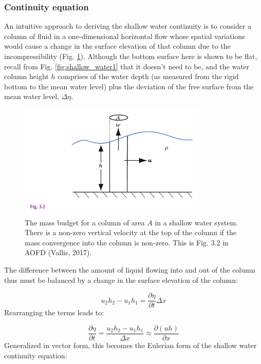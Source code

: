 \documentclass[12pt]{article}
\numberwithin{equation}{section}
\numberwithin{figure}{section}
\numberwithin{table}{section}
\begin{document}
\subsubsection{Continuity equation}

An intuitive approach to deriving the shallow water continuity is to consider
a column of fluid in a one-dimensional horizontal flow whose spatial variations
would cause a change in the surface elevation of that column due to the
incompressibility (Fig. \ref{fig:shallow_water2}).
Although the bottom surface here is shown to be flat, recall from Fig.
\ref{fig:shallow_water1} that it doesn't need to be, and the water column height
$h$ comprises of the water depth (as measured from the rigid bottom to the mean
water level) plus the deviation of the free surface from the mean water level,
$\Delta \eta$.

\begin{figure}[h]
  \centering
  \includegraphics[width=0.8\textwidth]{assets/fig_shallow_water2.pdf}
  \caption{
    The mass budget for a column of area $A$ in a shallow water system.
    There is a non-zero vertical velocity at the top of the column if the mass
    convergence into the column is non-zero.
    This is Fig. 3.2 in AOFD (Vallis, 2017).
  }
  \label{fig:shallow_water2}
\end{figure}

The difference between the amount of liquid flowing into and out of the column
thus must be balanced by a change in the surface elevation of the column:

\begin{equation}
  u_2 h_2 - u_1 h_1 = \frac{\partial \eta}{\partial t} \Delta x
\end{equation}
Rearranging the terms leads to:

\begin{equation}
  \frac{\partial \eta}{\partial t} = 
  \frac{u_2 h_2 - u_1 h_1}{\Delta x} \approx
  \frac{\partial (u h)}{\partial x}
  \label{eq:shallow_water_continuity1}
\end{equation}
Generalized in vector form, this becomes the Eulerian form of the shallow water
continuity equation:
\end{document}
